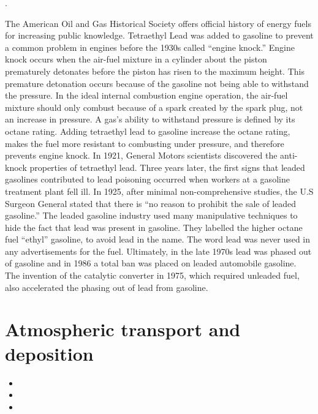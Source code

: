 \documentclass{article}\usepackage[]{graphicx}\usepackage[]{color}
\begin{document}
\bigskip

\noindent {} .

The American Oil and Gas Historical Society offers official history of energy fuels for increasing public knowledge. Tetraethyl Lead was added to gasoline to prevent a common problem in engines before the 1930s called “engine knock.” Engine knock occurs when the air-fuel mixture in a cylinder about the piston prematurely detonates before the piston has risen to the maximum height. This premature detonation occurs because of the gasoline not being able to withstand the pressure. In the ideal internal combustion engine operation, the air-fuel mixture should only combust because of a spark created by the spark plug, not an increase in pressure. A gas’s ability to withstand pressure is defined by its octane rating. Adding tetraethyl lead to gasoline increase the octane rating, makes the fuel more resistant to combusting under pressure, and therefore prevents engine knock. In 1921, General Motors scientists discovered the anti-knock properties of tetraethyl lead. Three years later, the first signs that leaded gasolines contributed to lead poisoning occurred when workers at a gasoline treatment plant fell ill. In 1925, after minimal non-comprehensive studies, the U.S Surgeon General stated that there is “no reason to prohibit the sale of leaded gasoline.” The leaded gasoline industry used many manipulative techniques to hide the fact that lead was present in gasoline. They labelled the higher octane fuel “ethyl” gasoline, to avoid lead in the name. The word lead was never used in any advertisements for the fuel. Ultimately, in the late 1970s lead was phased out of gasoline and in 1986 a total ban was placed on leaded automobile gasoline. The invention of the catalytic converter in 1975, which required unleaded fuel, also accelerated the phasing out of lead from gasoline. 

\bigskip



\section{Atmospheric transport and deposition}
\begin{itemize}
  \item {}
  \item {}
  \item {}
\end{itemize}
\end{document}
